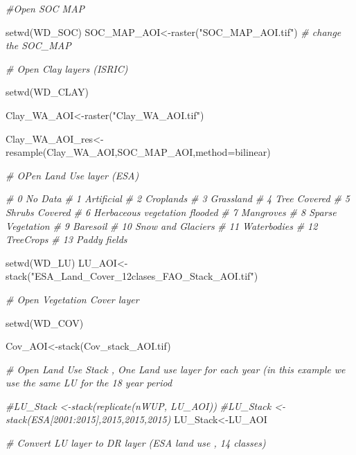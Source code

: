 \documentclass[
  10pt,
  b5paper,
]{book}
\newenvironment{Shaded}{\begin{snugshade}}{\end{snugshade}}
\newcommand{\AttributeTok}[1]{\textcolor[rgb]{0.77,0.63,0.00}{#1}}
\newcommand{\CommentTok}[1]{\textcolor[rgb]{0.56,0.35,0.01}{\textit{#1}}}
\newcommand{\FunctionTok}[1]{\textcolor[rgb]{0.00,0.00,0.00}{#1}}
\newcommand{\NormalTok}[1]{#1}
\newcommand{\OtherTok}[1]{\textcolor[rgb]{0.56,0.35,0.01}{#1}}
\newcommand{\StringTok}[1]{\textcolor[rgb]{0.31,0.60,0.02}{#1}}
\begin{document}
\begin{Shaded}
\begin{Highlighting}[]
\CommentTok{\#Open SOC MAP }

\FunctionTok{setwd}\NormalTok{(WD\_SOC)}
\NormalTok{SOC\_MAP\_AOI}\OtherTok{\textless{}{-}}\FunctionTok{raster}\NormalTok{(}\StringTok{"SOC\_MAP\_AOI.tif"}\NormalTok{) }\CommentTok{\# change the SOC\_MAP}

\CommentTok{\# Open Clay layers  (ISRIC)}

\FunctionTok{setwd}\NormalTok{(WD\_CLAY)}

\NormalTok{Clay\_WA\_AOI}\OtherTok{\textless{}{-}}\FunctionTok{raster}\NormalTok{(}\StringTok{"Clay\_WA\_AOI.tif"}\NormalTok{)}

\NormalTok{Clay\_WA\_AOI\_res}\OtherTok{\textless{}{-}}\FunctionTok{resample}\NormalTok{(Clay\_WA\_AOI,SOC\_MAP\_AOI,}\AttributeTok{method=}\StringTok{\textquotesingle{}bilinear\textquotesingle{}}\NormalTok{) }

\CommentTok{\# OPen Land Use layer (ESA)}

\CommentTok{\# 0 No Data}
\CommentTok{\# 1 Artificial}
\CommentTok{\# 2 Croplands}
\CommentTok{\# 3 Grassland}
\CommentTok{\# 4 Tree Covered}
\CommentTok{\# 5 Shrubs Covered}
\CommentTok{\# 6 Herbaceous vegetation flooded}
\CommentTok{\# 7 Mangroves}
\CommentTok{\# 8 Sparse Vegetation}
\CommentTok{\# 9 Baresoil}
\CommentTok{\# 10 Snow and Glaciers}
\CommentTok{\# 11 Waterbodies}
\CommentTok{\# 12 TreeCrops}
\CommentTok{\# 13 Paddy fields}


\FunctionTok{setwd}\NormalTok{(WD\_LU)}
\NormalTok{LU\_AOI}\OtherTok{\textless{}{-}}\FunctionTok{stack}\NormalTok{(}\StringTok{"ESA\_Land\_Cover\_12clases\_FAO\_Stack\_AOI.tif"}\NormalTok{)}

\CommentTok{\# Open Vegetation Cover layer }

\FunctionTok{setwd}\NormalTok{(WD\_COV)}

\NormalTok{Cov\_AOI}\OtherTok{\textless{}{-}}\FunctionTok{stack}\NormalTok{(}\StringTok{\textquotesingle{}Cov\_stack\_AOI.tif\textquotesingle{}}\NormalTok{)}

\CommentTok{\# Open Land Use Stack , One Land use layer for each year (in this example we use the same LU for the 18 year period}

\CommentTok{\#LU\_Stack \textless{}{-}stack(replicate(nWUP, LU\_AOI))}
\CommentTok{\#LU\_Stack \textless{}{-}stack(ESA[2001:2015],2015,2015,2015)}
\NormalTok{LU\_Stack}\OtherTok{\textless{}{-}}\NormalTok{LU\_AOI}

\CommentTok{\# Convert LU layer  to DR layer (ESA land use , 14 classes)}


\end{Highlighting}
\end{Shaded}
\end{document}
